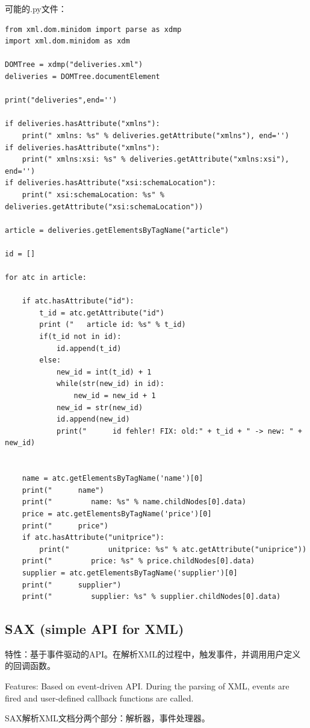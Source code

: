 \documentclass[fontset=windows]{article}
\begin{document}
可能的.py文件：
\begin{verbatim}
from xml.dom.minidom import parse as xdmp
import xml.dom.minidom as xdm

DOMTree = xdmp("deliveries.xml")
deliveries = DOMTree.documentElement

print("deliveries",end='')

if deliveries.hasAttribute("xmlns"):
    print(" xmlns: %s" % deliveries.getAttribute("xmlns"), end='')
if deliveries.hasAttribute("xmlns"):
    print(" xmlns:xsi: %s" % deliveries.getAttribute("xmlns:xsi"), end='')
if deliveries.hasAttribute("xsi:schemaLocation"):
    print(" xsi:schemaLocation: %s" % deliveries.getAttribute("xsi:schemaLocation"))

article = deliveries.getElementsByTagName("article")

id = []

for atc in article:

    if atc.hasAttribute("id"):
        t_id = atc.getAttribute("id")
        print ("   article id: %s" % t_id)
        if(t_id not in id):
            id.append(t_id)
        else:
            new_id = int(t_id) + 1
            while(str(new_id) in id):
                new_id = new_id + 1
            new_id = str(new_id)
            id.append(new_id)
            print("      id fehler! FIX: old:" + t_id + " -> new: " + new_id)


    name = atc.getElementsByTagName('name')[0]
    print("      name")
    print("         name: %s" % name.childNodes[0].data)
    price = atc.getElementsByTagName('price')[0]
    print("      price")
    if atc.hasAttribute("unitprice"):
        print("         unitprice: %s" % atc.getAttribute("uniprice"))
    print("         price: %s" % price.childNodes[0].data)
    supplier = atc.getElementsByTagName('supplier')[0]
    print("      supplier")
    print("         supplier: %s" % supplier.childNodes[0].data)
\end{verbatim}

\subsection{SAX (simple API for XML)}

特性：基于事件驱动的API。在解析XML的过程中，触发事件，并调用用户定义的回调函数。

Features: Based on event-driven API. During the parsing of XML, events are fired and user-defined callback functions are called.

SAX解析XML文档分两个部分：解析器，事件处理器。
\end{document}
